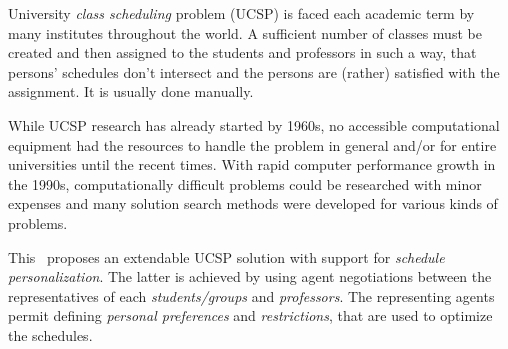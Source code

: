 University \emph{class scheduling} problem (UCSP) is faced each academic term
by many institutes throughout the world. A sufficient number of classes must
be created and then assigned to the students and professors in such a way,
that persons' schedules don't intersect and the persons are (rather) satisfied
with the assignment. It is usually done manually.

While UCSP research has already started by 1960s,
no accessible computational equipment had the resources to handle the problem
in general and/or for entire universities until the recent times.
With rapid computer performance growth in the 1990s, computationally
difficult problems could be researched with minor expenses and many
solution search methods were developed for various kinds of problems.
\medskip

\noindent
This \thisdoc\ proposes an extendable UCSP solution with support for
\emph{schedule personalization}. The latter is achieved by using agent
negotiations between the representatives of each \emph{students/groups} and
\emph{professors}. The representing agents permit defining
\emph{personal preferences} and \emph{restrictions}, that are used to optimize
the schedules.
